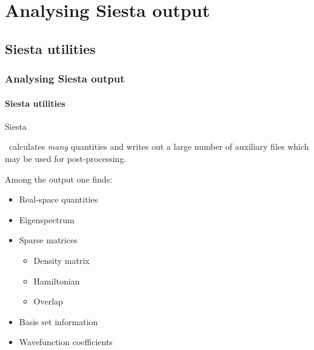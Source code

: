 
\section{Analysing Siesta output}



\subsection{Siesta utilities}

\begin{frame}
  \frametitle{Analysing Siesta output}
  \framesubtitle{Siesta utilities}

  \begin{block}{Siesta}

    \siesta\ calculates \emph{many} quantities and writes out a large number of auxiliary
    files which may be used for post-processing.

    Among the output one finds:
    \begin{itemize}
      \item Real-space quantities
      \item Eigenspectrum
      \item Sparse matrices
      \begin{itemize}
        \item Density matrix
        \item Hamiltonian
        \item Overlap
      \end{itemize}
      \item Basis set information
      \item Wavefunction coefficients
    \end{itemize}

  \end{block}

\end{frame}


